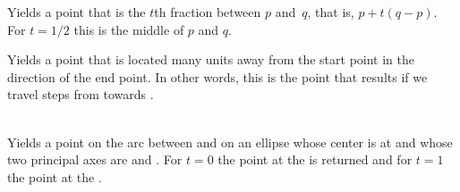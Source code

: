 \begin{command}{\pgfpointlineattime{}}
    Yields a point that is the $t$th fraction between $p$ and~$q$, that is, $p
    + t(q-p)$. For $t=1/2$ this is the middle of $p$ and $q$.
\begin{codeexample}[]
\end{codeexample}
\end{command}

\begin{command}{\pgfpointlineatdistance{}}
    Yields a point that is located  many units away from the
    start point in the direction of the end point. In other words, this is the
    point that results if we travel  steps from  towards .
    \example
\begin{codeexample}[]
\end{codeexample}
\end{command}

\begin{command}{\pgfpointarcaxesattime{}\\}
    Yields a point on the arc between  and 
    on an ellipse whose center is at  and whose two principal axes
    are  and . For $t=0$ the point at
    the  is returned and for $t=1$ the point at the .
\begin{codeexample}[]
\end{codeexample}
\end{command}

